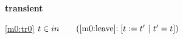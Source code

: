 \textbf{transient}
\begin{block}
\item[ \eqref{m0:tr0} ]{$t \in in  \qquad \text{(\ref{m0:leave}$: [t := t'~|~t' = t]$)}$} %
\end{block}
